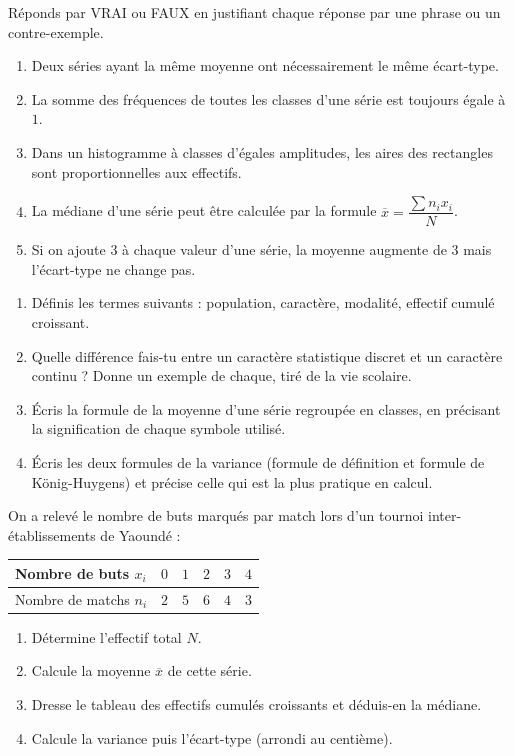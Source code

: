 \documentclass[11pt]{article}
\newcommand{\cle}[1]{{\popxbold\color{popdark}#1}}
\begin{document}
\begin{exercice}
Réponds par VRAI ou FAUX en justifiant chaque réponse par une phrase ou un contre-exemple.
\begin{enumerate}
\item Deux séries ayant la même moyenne ont nécessairement le même écart-type.
\item La somme des fréquences de toutes les classes d'une série est toujours égale à $1$.
\item Dans un histogramme à classes d'égales amplitudes, les aires des rectangles sont proportionnelles aux effectifs.
\item La médiane d'une série peut être calculée par la formule $\overline{x} = \dfrac{\sum n_i x_i}{N}$.
\item Si on ajoute $3$ à chaque valeur d'une série, la moyenne augmente de $3$ mais l'écart-type ne change pas.
\end{enumerate}
\end{exercice}

\begin{exercice}
\begin{enumerate}
\item Définis les termes suivants : \cle{population}, \cle{caractère}, \cle{modalité}, \cle{effectif cumulé croissant}.
\item Quelle différence fais-tu entre un caractère statistique discret et un caractère continu ? Donne un exemple de chaque, tiré de la vie scolaire.
\item Écris la formule de la moyenne d'une série regroupée en classes, en précisant la signification de chaque symbole utilisé.
\item Écris les deux formules de la variance (formule de définition et formule de König-Huygens) et précise celle qui est la plus pratique en calcul.
\end{enumerate}
\end{exercice}

\begin{exercice}
On a relevé le nombre de buts marqués par match lors d'un tournoi inter-établissements de Yaoundé :
\begin{center}
\begin{tabular}{|l|ccccc|}
\hline
\rowcolor{popblueL} Nombre de buts $x_i$ & $0$ & $1$ & $2$ & $3$ & $4$ \\
\hline
Nombre de matchs $n_i$ & $2$ & $5$ & $6$ & $4$ & $3$ \\
\hline
\end{tabular}
\end{center}
\begin{enumerate}
\item Détermine l'effectif total $N$.
\item Calcule la moyenne $\overline{x}$ de cette série.
\item Dresse le tableau des effectifs cumulés croissants et déduis-en la médiane.
\item Calcule la variance puis l'écart-type (arrondi au centième).
\end{enumerate}
\end{exercice}
\end{document}
